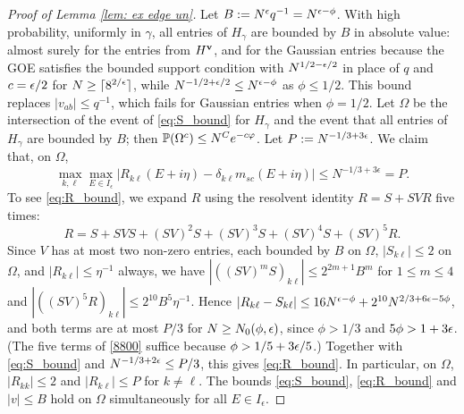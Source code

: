 \begin{proof}[Proof of Lemma \ref{lem: ex edge un}]
Let $B:=N^{\epsilon}q^{-1}=N^{\epsilon-\phi}$. With high probability, uniformly in $\gamma$, all entries of $H_\gamma$ are bounded by $B$ in absolute value: almost surely for the entries from $H^{\mathbf{v}}$, and for the Gaussian entries because the GOE satisfies the bounded support condition with $N^{1/2-\epsilon/2}$ in place of $q$ and $c=\epsilon/2$ for $N\ge\lceil 8^{2/\epsilon}\rceil$, while $N^{-1/2+\epsilon/2}\le N^{\epsilon-\phi}$ as $\phi\le1/2$. This bound replaces $|v_{ab}|\le q^{-1}$, which fails for Gaussian entries when $\phi=1/2$. Let $\Omega$ be the intersection of the event of \eqref{eq:S_bound} for $H_\gamma$ and the event that all entries of $H_\gamma$ are bounded by $B$; then $\mathbb{P}(\Omega^c)\le N^{C}e^{-c\varphi}$. Let $P:=N^{-1/3+3\epsilon}$. We claim that, on $\Omega$,
\begin{equation} \label{eq:R_bound}
\max_{k, \ell} \max_{E \in I_{\epsilon}} |R_{k \ell} (E + i \eta) - \delta_{k \ell} m_{sc} (E + i \eta)| \leq N^{-1/3 + 3\epsilon}=P.
\end{equation}
To see \eqref{eq:R_bound}, we expand $R$ using the resolvent identity $R=S+SVR$ five times:
\begin{equation}\label{8800}
R = S + SVS + (SV)^2 S + (SV)^3 S + (SV)^4 S + (SV)^5 R.
\end{equation}
Since $V$ has at most two non-zero entries, each bounded by $B$ on $\Omega$, $|S_{k\ell}|\le2$ on $\Omega$, and $|R_{k\ell}|\le\eta^{-1}$ always, we have $|((SV)^mS)_{k\ell}|\le 2^{2m+1}B^m$ for $1\le m\le4$ and $|((SV)^5R)_{k\ell}|\le 2^{10}B^5\eta^{-1}$. Hence $|R_{k\ell}-S_{k\ell}|\le 16N^{\epsilon-\phi}+2^{10}N^{2/3+6\epsilon-5\phi}$, and both terms are at most $P/3$ for $N\ge N_0(\phi,\epsilon)$, since $\phi>1/3$ and $5\phi>1+3\epsilon$. (The five terms of \eqref{8800} suffice because $\phi>1/5+3\epsilon/5$.) Together with \eqref{eq:S_bound} and $N^{-1/3+2\epsilon}\le P/3$, this gives \eqref{eq:R_bound}. In particular, on $\Omega$, $|R_{kk}|\le2$ and $|R_{k\ell}|\le P$ for $k\ne\ell$. The bounds \eqref{eq:S_bound}, \eqref{eq:R_bound} and $|v|\le B$ hold on $\Omega$ simultaneously for all $E\in I_\epsilon$.


\end{proof}

